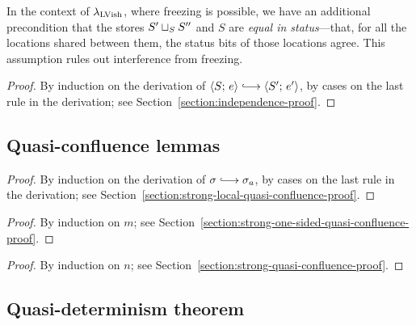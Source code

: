 In the context of $\lambda_{\textrm{LVish}}$, where freezing is possible, we have
an additional precondition that the stores $S' \sqcup_{S} S''$ and
$S$ are \emph{equal in status}---that, for all the locations shared
between them, the status bits of those locations agree.  This
assumption rules out interference from freezing.

\DefEqualStatus

\LemIndependence
\begin{proof}
   By induction on the derivation of $\config{S}{e} \parstepsto
   \config{S'}{e'}$, by cases on the last rule in the derivation; see
   Section~\ref{section:independence-proof}.
\end{proof}

\subsection{Quasi-confluence lemmas}\label{subsection:quasi-quasi-confluence}



\LemStrongLocalQuasiConfluence
\begin{proof}
  By induction on the derivation of $\conf \parstepsto \conf_a$, by
  cases on the last rule in the derivation; see
  Section~\ref{section:strong-local-quasi-confluence-proof}.
\end{proof}

\LemStrongOneSidedQuasiConfluence
\begin{proof}
  By induction on $m$; see
  Section~\ref{section:strong-one-sided-quasi-confluence-proof}.
\end{proof}

\LemStrongQuasiConfluence
\begin{proof}
  By induction on $n$; see
  Section~\ref{section:strong-quasi-confluence-proof}.
\end{proof}

\LemQuasiConfluence
 
\subsection{Quasi-determinism theorem}\label{subsection:quasi-quasi-determinism}

\ThmQuasiDeterminism
